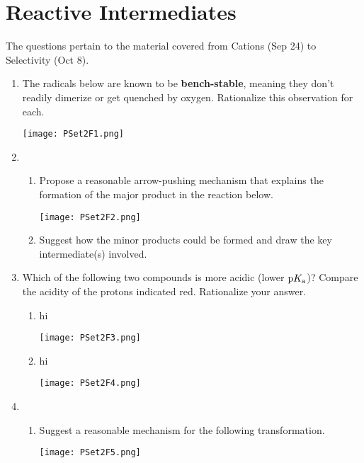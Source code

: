 \documentclass[../psets.tex]{subfiles}
\begin{document}
\section{Reactive Intermediates}
The questions pertain to the material covered from Cations (Sep 24) to Selectivity (Oct 8).
\begin{enumerate}
    \item The radicals below are known to be \textbf{bench-stable}, meaning they don't readily dimerize or get quenched by oxygen. Rationalize this observation for each.
    \begin{center}
        \texttt{[image: PSet2F1.png]}
    \end{center}
    \item 
    \begin{enumerate}
        \item Propose a reasonable arrow-pushing mechanism that explains the formation of the major product in the reaction below.
        \begin{center}
            \texttt{[image: PSet2F2.png]}
        \end{center}
        \item Suggest how the minor products could be formed and draw the key intermediate(s) involved.
    \end{enumerate}
    \item Which of the following two compounds is more acidic (lower $\textup{p}K_\textup{a}$)? Compare the acidity of the protons indicated red. Rationalize your answer.
    \begin{enumerate}
        \item {\color{white}hi}
        \begin{center}
            \texttt{[image: PSet2F3.png]}
        \end{center}
        \item {\color{white}hi}
        \begin{center}
            \texttt{[image: PSet2F4.png]}
        \end{center}
    \end{enumerate}
    \item 
    \begin{enumerate}
        \item Suggest a reasonable mechanism for the following transformation.
        \begin{center}
            \texttt{[image: PSet2F5.png]}

\end{center}
\end{enumerate}
\end{enumerate}
\end{document}

